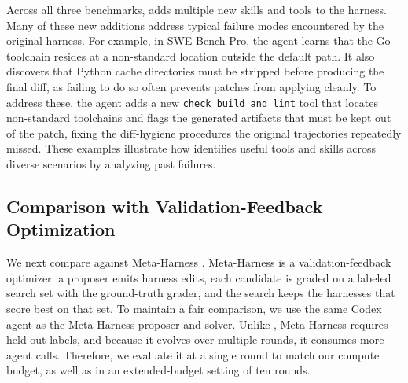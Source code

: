 Across all three benchmarks, \method{} adds multiple new skills and tools to the harness.
Many of these new additions address typical failure modes encountered by the original harness.
For example, in SWE-Bench Pro, the agent learns that the Go toolchain resides at a non-standard location outside the default path.
It also discovers that Python cache directories must be stripped before producing the final diff, as failing to do so often prevents patches from applying cleanly.
To address these, the agent adds a new \texttt{check\_build\_and\_lint} tool that locates non-standard toolchains and flags the generated artifacts that must be kept out of the patch, fixing the diff-hygiene procedures the original trajectories repeatedly missed.
These examples illustrate how \method{} identifies useful tools and skills across diverse scenarios by analyzing past failures.

\subsection{Comparison with Validation-Feedback Optimization}

We next compare \method{} against Meta-Harness \citep{lee2026metaharness}.
Meta-Harness is a validation-feedback optimizer: a proposer emits harness edits, each candidate is graded on a labeled search set with the ground-truth grader, and the search keeps the harnesses that score best on that set.
To maintain a fair comparison, we use the same Codex agent as the Meta-Harness proposer and solver.
Unlike \method{}, Meta-Harness requires held-out labels, and because it evolves over multiple rounds, it consumes more agent calls.
Therefore, we evaluate it at a single round to match our compute budget, as well as in an extended-budget setting of ten rounds.

\begin{table}[t]
\caption{\method{} versus Meta-Harness, a validation-feedback optimizer, on SWE-Bench Pro. \emph{Agent calls} is the optimization-time budget relative to one \method{} run. Held-out pass rate on the same split as Table~\ref{tab:main}.}
\label{tab:meta-harness}
\centering
\footnotesize
\setlength{\tabcolsep}{4pt}
\vspace{-1.5em}
\end{table}

